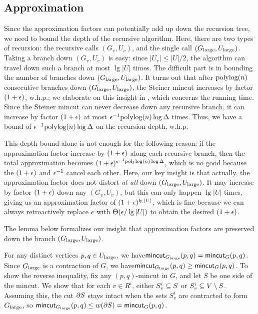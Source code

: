 
\subsection{Approximation}

Since the approximation factors can potentially add up down the recursion tree, we need to bound the depth of the recursive algorithm. Here, there are two types of recursion: the recursive calls $(G_v,U_v)$, and the single call $(G_{\textup{large}},U_{\textup{large}})$.  Taking a branch down $(G_v,U_v)$ is easy: since $|U_v|\le|U|/2$, the algorithm can travel down such a branch at most $\lg|U|$ times. The difficult part is in bounding the number of branches down $(G_{\textup{large}},U_{\textup{large}})$. It turns out that after $\textup{polylog}(n)$ consecutive branches down $(G_{\textup{large}},U_{\textup{large}})$, the Steiner mincut increases by factor $(1+\epsilon)$, w.h.p.; we elaborate on this insight in , which concerns the running time. Since the Steiner mincut can never decrease down any recursive branch, it can increase by factor $(1+\epsilon)$ at most $\epsilon^{-1}\textup{polylog}(n)\log\Delta$ times. Thus, we have a bound of $\epsilon^{-1}\textup{polylog}(n)\log\Delta$ on the recursion depth, w.h.p.

This depth bound alone is not enough for the following reason: if the approximation factor increase by $(1+\epsilon)$ along each recursive branch, then the total approximation becomes $(1+\epsilon)^{\epsilon^{-1}\textup{polylog}(n)\log\Delta}$, which is no good because the $(1+\epsilon)$ and $\epsilon^{-1}$ cancel each other. Here, our key insight is that actually, the approximation factor does not distort \emph{at all} down $(G_{\textup{large}},U_{\textup{large}})$. It may increase by factor $(1+\epsilon)$ down any $(G_v,U_v)$, but this can only happen $\lg|U|$ times, giving us an approximation factor of $(1+\epsilon)^{\lg|U|}$, which is fine because we can always retroactively replace $\epsilon$ with $\Theta(\epsilon/\lg|U|)$ to obtain the desired $(1+\epsilon)$.

The lemma below formalizes our insight that approximation factors are preserved down the branch $(G_{\textup{large}},U_{\textup{large}})$.

\BL{}
For any distinct vertices $p,q\in U_{\textup{large}}$, we have\linebreak $\textsf{\textup{mincut}}_{G_{\textup{large}}}(p,q) = \textsf{\textup{mincut}}_G(p,q)$.
\EL
\BP
Since $G_{\textup{large}}$ is a contraction of $G$, we have\linebreak $\textsf{\textup{mincut}}_{G_{\textup{large}}}(p,q) \ge \textsf{\textup{mincut}}_G(p,q)$. To show the reverse inequality, fix any $(p,q)$-mincut in $G$, and let $S$ be one side of the mincut. We show that for each $v\in  R^i$, either $S^i_v\subseteq S$ or $S^i_v\subseteq V\setminus S$. Assuming this, the cut $\partial S$ stays intact when the sets $S^i_v$ are contracted to form $G_{\textup{large}}$, so $\textsf{\textup{mincut}}_{G_{\textup{large}}}(p,q) \le w(\partial S) = \textsf{\textup{mincut}}_G(p,q)$.

